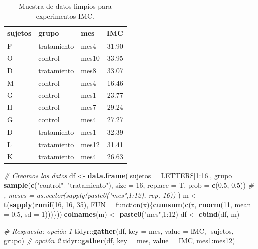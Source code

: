 \documentclass[]{article}
\newenvironment{Shaded}{\begin{snugshade}}{\end{snugshade}}
\newcommand{\KeywordTok}[1]{\textcolor[rgb]{0.13,0.29,0.53}{\textbf{{#1}}}}
\newcommand{\DataTypeTok}[1]{\textcolor[rgb]{0.13,0.29,0.53}{{#1}}}
\newcommand{\DecValTok}[1]{\textcolor[rgb]{0.00,0.00,0.81}{{#1}}}
\newcommand{\FloatTok}[1]{\textcolor[rgb]{0.00,0.00,0.81}{{#1}}}
\newcommand{\StringTok}[1]{\textcolor[rgb]{0.31,0.60,0.02}{{#1}}}
\newcommand{\CommentTok}[1]{\textcolor[rgb]{0.56,0.35,0.01}{\textit{{#1}}}}
\newcommand{\NormalTok}[1]{{#1}}
\begin{document}
\begin{table}[H]
\centering
\begin{tabular}{lllr}
  \hline
sujetos & grupo & mes & IMC \\ 
  \hline
F & tratamiento & mes4 & 31.90 \\ 
  O & control & mes10 & 33.95 \\ 
  D & tratamiento & mes8 & 33.07 \\ 
  M & control & mes4 & 16.46 \\ 
  G & control & mes1 & 23.77 \\ 
  H & control & mes7 & 29.24 \\ 
  G & control & mes4 & 27.27 \\ 
  D & tratamiento & mes1 & 32.39 \\ 
  L & tratamiento & mes12 & 31.41 \\ 
  K & tratamiento & mes4 & 26.63 \\ 
   \hline
\end{tabular}
\caption{Muestra de datos limpios para experimentos IMC.} 
\label{tab:sujetostidy}
\end{table}

\begin{Shaded}
\begin{Highlighting}[]
\CommentTok{# Creamos los datos}
\NormalTok{df <-}\StringTok{ }\KeywordTok{data.frame}\NormalTok{(}
  \DataTypeTok{sujetos =} \NormalTok{LETTERS[}\DecValTok{1}\NormalTok{:}\DecValTok{16}\NormalTok{],}
  \DataTypeTok{grupo =} \KeywordTok{sample}\NormalTok{(}\KeywordTok{c}\NormalTok{(}\StringTok{"control"}\NormalTok{, }\StringTok{"tratamiento"}\NormalTok{), }\DataTypeTok{size =} \DecValTok{16}\NormalTok{, }\DataTypeTok{replace =} \NormalTok{T, }\DataTypeTok{prob =} \KeywordTok{c}\NormalTok{(}\FloatTok{0.5}\NormalTok{, }\FloatTok{0.5}\NormalTok{))}
  \CommentTok{# ,  meses = as.vector(sapply(paste0("mes",1:12), rep, 16))}
  \NormalTok{)}
\NormalTok{m <-}\StringTok{ }\KeywordTok{t}\NormalTok{(}\KeywordTok{sapply}\NormalTok{(}\KeywordTok{runif}\NormalTok{(}\DecValTok{16}\NormalTok{, }\DecValTok{16}\NormalTok{, }\DecValTok{35}\NormalTok{), }\DataTypeTok{FUN =} \NormalTok{function(x)\{}\KeywordTok{cumsum}\NormalTok{(}\KeywordTok{c}\NormalTok{(x, }\KeywordTok{rnorm}\NormalTok{(}\DecValTok{11}\NormalTok{, }\DataTypeTok{mean =} \FloatTok{0.5}\NormalTok{, }\DataTypeTok{sd =} \DecValTok{1}\NormalTok{)))\}))}
\KeywordTok{colnames}\NormalTok{(m) <-}\StringTok{ }\KeywordTok{paste0}\NormalTok{(}\StringTok{"mes"}\NormalTok{,}\DecValTok{1}\NormalTok{:}\DecValTok{12}\NormalTok{)}
\NormalTok{df <-}\StringTok{ }\KeywordTok{cbind}\NormalTok{(df, m)}

\CommentTok{# Respuesta: opción 1}
\NormalTok{tidyr::}\KeywordTok{gather}\NormalTok{(df, }\DataTypeTok{key =} \NormalTok{mes, }\DataTypeTok{value =} \NormalTok{IMC, -sujetos, -grupo)}
\CommentTok{# opción 2}
\NormalTok{tidyr::}\KeywordTok{gather}\NormalTok{(df, }\DataTypeTok{key =} \NormalTok{mes, }\DataTypeTok{value =} \NormalTok{IMC, mes1:mes12)}
\end{Highlighting}
\end{Shaded}
\end{document}
